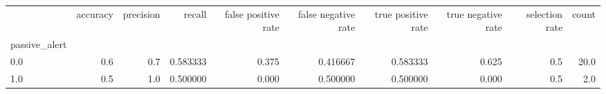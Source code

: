 \begin{tabular}{lrrrrrrrrr}
\toprule
{} &  accuracy &  precision &    recall &  false positive rate &  false negative rate &  true positive rate &  true negative rate &  selection rate &  count \\
passive\_alert &           &            &           &                      &                      &                     &                     &                 &        \\
\midrule
0.0           &       0.6 &        0.7 &  0.583333 &                0.375 &             0.416667 &            0.583333 &               0.625 &             0.5 &   20.0 \\
1.0           &       0.5 &        1.0 &  0.500000 &                0.000 &             0.500000 &            0.500000 &               0.000 &             0.5 &    2.0 \\
\bottomrule
\end{tabular}
